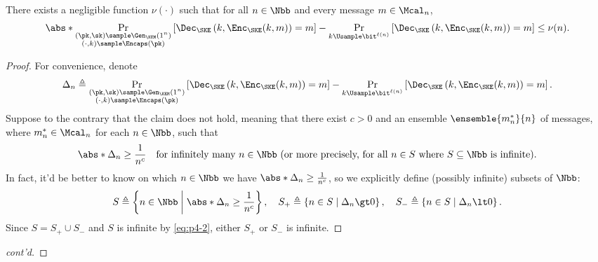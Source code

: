 \begin{answer}
    \begin{claim}\label{claim:p4-1}
        There exists a negligible function $\nu(\cdot)$ such that for all $n\in\Nbb$ and every message $m\in\Mcal_n$,
        \[
            \abs*{\Pr_{\substack{(\pk, \sk)\sample \Gen_\KEM(1^n)\\(\cdot, k)\sample\Encaps(\pk)}}\left[\Dec_\SKE\left(k, \Enc_\SKE(k, m)\right)= m \right] - \Pr_{k\Usample\bit^{\ell(n)}}\left[\Dec_\SKE\left(k, \Enc_\SKE(k, m)\right)= m \right]}
            \le \nu(n).
        \]
    \end{claim}
    \begin{proof}
        For convenience, denote 
        \[
            \Delta_n \triangleq \Pr_{\substack{(\pk, \sk)\sample \Gen_\KEM(1^n)\\(\cdot, k)\sample\Encaps(\pk)}}\left[\Dec_\SKE\left(k, \Enc_\SKE(k, m)\right)= m \right] - \Pr_{k\Usample\bit^{\ell(n)}}\left[\Dec_\SKE\left(k, \Enc_\SKE(k, m)\right)= m \right].
        \]
        Suppose to the contrary that the claim does not hold, meaning that there exist $c\gt 0$ and an ensemble $\ensemble{m^\ast_n}{n}$ of messages, where $m^\ast_n\in\Mcal_n$ for each $n\in\Nbb$, such that
        \begin{equation}\label{eq:p4-2}
            \abs*{\Delta_n} \ge \frac{1}{n^c} \quad \textrm{for infinitely many $n\in\Nbb$ (or more precisely, for all $n\in S$ where $S\subseteq \Nbb$ is infinite)}.
        \end{equation}
        In fact, it'd be better to know on which $n\in\Nbb$ we have $\abs*{\Delta_n} \ge \frac{1}{n^c}$, so we explicitly define (possibly infinite) subsets of $\Nbb$:
        \[
            S\triangleq \left\{n\in\Nbb \biggm\vert \abs*{\Delta_n} \ge \frac{1}{n^c} \right\},
            \quad S_+\triangleq \left\{n\in S \mid \Delta_n \gt 0 \right\},
            \quad S_-\triangleq \left\{n\in S \mid \Delta_n \lt 0 \right\}.
        \]
        Since $S= S_+ \cup S_-$ and $S$ is infinite by \eqref{eq:p4-2}, either $S_+$ or $S_-$ is infinite.
        \end{proof}\begin{proof}[cont'd]


\end{proof}
\end{answer}
